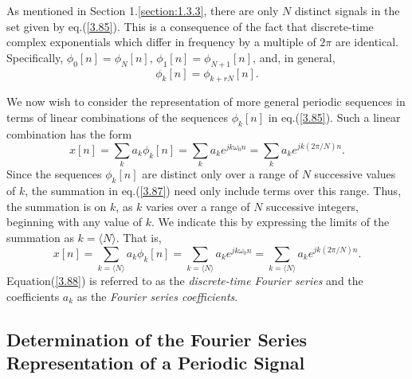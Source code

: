 \documentclass[a4paper,10pt,twoside]{book}
\begin{document}
As mentioned in Section 1.\ref{section:1.3.3}, there are only $N$ distinct signals in the set given by eq.\;(\ref{3.85}). This is a consequence of the fact that discrete-time complex exponentials which differ in frequency by a multiple of $2\pi$ are identical. Specifically, $\phi_0[n]=\phi_N[n]$, $\phi_1[n]=\phi_{N+1}[n]$, and, in general,
\begin{equation}
    \phi_k[n]=\phi_{k+rN}[n].
    \label{3.86}
\end{equation}

We now wish to consider the representation of more general periodic sequences in terms of linear combinations of the sequences $\phi_k[n]$ in eq.\;(\ref{3.85}). Such a linear combination has the form
\begin{equation}
    x[n]=\sum_ka_k\phi_k[n]=\sum_ka_ke^{jk\omega_0n}=\sum_ka_ke^{jk(2\pi/N)n}.
    \label{3.87}
\end{equation}
Since the sequences $\phi_k[n]$ are distinct only over a range of $N$ successive values of $k$, the summation in eq.\;(\ref{3.87}) need only include terms over this range. Thus, the summation is on $k$, as $k$ varies over a range of $N$ successive integers, beginning with any value of $k$. We indicate this by expressing the limits of the summation as $k=\langle N\rangle$. That is,
\begin{equation}
    x[n]=\sum_{k=\langle N\rangle}a_{k}\phi_{k}[n]=\sum_{k=\langle N\rangle}a_{k}e^{jk\omega_{0}n}=\sum_{k=\langle N\rangle}a_{k}e^{jk(2\pi/N)n}.
    \label{3.88}
\end{equation}
Equation\;(\ref{3.88}) is referred to as the \textit{discrete-time Fourier series} and the coefficients $a_k$ as the \textit{Fourier series coefficients}.

\subsection{Determination of the Fourier Series Representation of a Periodic Signal}
\end{document}
